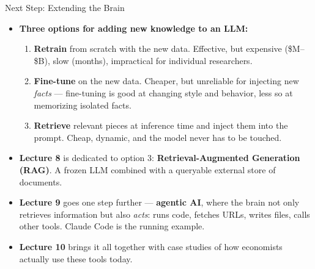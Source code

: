 \documentclass[10pt,english,aspectratio=169]{beamer}
\begin{document}
\begin{frame}{Next Step: Extending the Brain}
\begin{itemize}
\item \textbf{Three options for adding new knowledge to an LLM:}
\begin{enumerate}
    \item \textbf{Retrain} from scratch with the new data. Effective, but expensive (\$M--\$B), slow (months), impractical for individual researchers.
    \medskip
    \item \textbf{Fine-tune} on the new data. Cheaper, but unreliable for injecting new \emph{facts} --- fine-tuning is good at changing style and behavior, less so at memorizing isolated facts.
    \medskip
    \item \textbf{Retrieve} relevant pieces at inference time and inject them into the prompt. Cheap, dynamic, and the model never has to be touched.
\end{enumerate}

\medskip
\item \textbf{Lecture 8} is dedicated to option 3: \textbf{Retrieval-Augmented Generation (RAG)}. A frozen LLM combined with a queryable external store of documents.

\medskip
\item \textbf{Lecture 9} goes one step further --- \textbf{agentic AI}, where the brain not only retrieves information but also \emph{acts}: runs code, fetches URLs, writes files, calls other tools. Claude Code is the running example.

\medskip
\item \textbf{Lecture 10} brings it all together with case studies of how economists actually use these tools today.
\end{itemize}
\end{frame}

\end{document}
